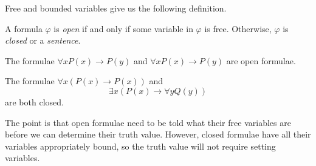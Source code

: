 Free and bounded variables give us the following definition.
\begin{definition}
	A formula $\varphi$ is \textit{open} if and only if some variable in $\varphi$ is free. Otherwise, $\varphi$ is \textit{closed} or a \textit{sentence}.
\end{definition}
\begin{example}
	The formulae $\forall xP(x)\to P(y)$ and $\forall xP(x)\to P(y)$ are open formulae.
\end{example}
\begin{example}
	The formulae $\forall x(P(x)\to P(x))$ and
	\[\exists x(P(x)\to\forall yQ(y))\]
	are both closed.
\end{example}
The point is that open formulae need to be told what their free variables are before we can determine their truth value. However, closed formulae have all their variables appropriately bound, so the truth value will not require setting variables.

